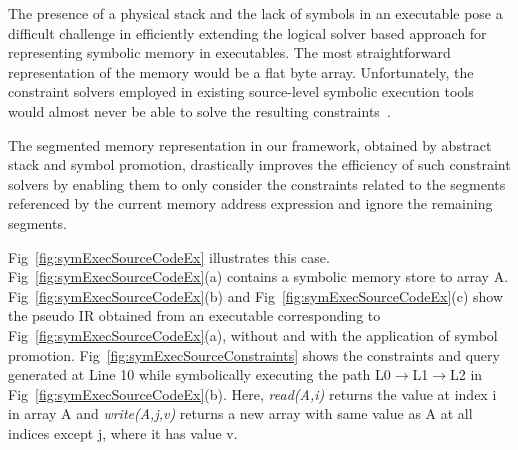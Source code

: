 
The presence of a physical stack and the lack of symbols in an executable pose a difficult challenge in efficiently extending the logical solver based approach for representing symbolic memory in executables. The most straightforward representation of the memory would be a flat byte array. Unfortunately, the  constraint solvers employed in existing source-level symbolic execution tools would almost never be able to solve the resulting constraints~\cite{Cadar-KLEE}. 

The segmented memory representation in our framework, obtained by abstract stack and symbol promotion, drastically improves the efficiency of such constraint solvers by enabling them to only consider the constraints related to the segments referenced by the current memory address expression and ignore the remaining segments.

Fig~\ref{fig:symExecSourceCodeEx} illustrates this case. Fig~\ref{fig:symExecSourceCodeEx}(a) contains a symbolic memory store to array A. Fig~\ref{fig:symExecSourceCodeEx}(b) and Fig~\ref{fig:symExecSourceCodeEx}(c) show the pseudo IR obtained from an executable corresponding to Fig~\ref{fig:symExecSourceCodeEx}(a), without and with the application of symbol promotion. Fig~\ref{fig:symExecSourceConstraints} shows the constraints and query generated at Line 10 while symbolically executing the path L0$\rightarrow$L1$\rightarrow$L2 in Fig~\ref{fig:symExecSourceCodeEx}(b). Here, \emph{read(A,i)} returns the value at index i in array A and \emph{write(A,j,v)} returns a new array with same value as A at all indices except j, where it has value v.

